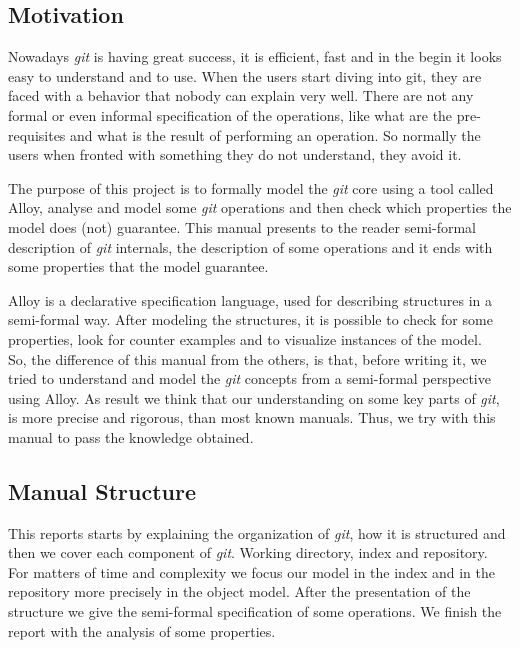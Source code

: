 \subsection{Motivation}
Nowadays \emph{git} is having great success, it is efficient, fast and
in the begin it looks easy to understand and to use. When
the users start diving into git, they are faced with a behavior that
nobody can explain very well. There are not any formal or even informal
specification of the operations, like what are the pre-requisites and
what is the result of performing an operation. So normally the users
when fronted with something they do not understand, they avoid it.\par
The purpose of this project is to
formally model the \emph{git} core using a tool called 
Alloy, analyse and model some \emph{git}
operations and then check which properties the model does (not)
guarantee. This manual presents to the reader semi-formal description of
\emph{git} internals, the description of some operations and it ends with
some properties that the model guarantee.\par
Alloy is a declarative specification language, used for describing structures in 
a semi-formal way. After modeling the structures, it is possible to
check for some properties, look for counter examples and to visualize 
instances of the model. \\

So, the difference of this manual from the others, is
that, before writing it, we tried to understand and model 
the \emph{git} concepts from a semi-formal perspective using Alloy. As result 
we think that our understanding on some key parts of \emph{git}, is more precise
and rigorous, than most known manuals. Thus, we try with this manual
to pass the knowledge obtained. \par 

\subsection{Manual Structure}
This reports starts by explaining the organization of \emph{git}, how
it is structured and then we cover each component of \emph{git}. 
Working directory, index and repository. For matters
of time and complexity we focus our model in the index and in the
repository more precisely in the object model. 
After the presentation of the structure we give the semi-formal
specification of some operations. We finish the report with the
analysis of some properties.


